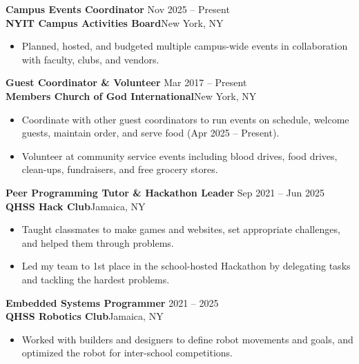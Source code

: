 \documentclass[10pt,letterpaper]{article}
\newcommand{\entry}[4]{%
  \textbf{#1} \hfill {\color{muted}#3}\\
  {\color{accent}\textbf{#2}}\hfill {\color{muted}\small #4}\par}
\begin{document}
\vspace{3pt}
\entry{Campus Events Coordinator}{NYIT Campus Activities Board}{Nov 2025 -- Present}{New York, NY}
\begin{itemize}
  \item Planned, hosted, and budgeted multiple campus-wide events in collaboration with faculty, clubs, and vendors.
\end{itemize}
\vspace{3pt}
\entry{Guest Coordinator \& Volunteer}{Members Church of God International}{Mar 2017 -- Present}{New York, NY}
\begin{itemize}
  \item Coordinate with other guest coordinators to run events on schedule, welcome guests, maintain order, and serve food (Apr 2025 -- Present).
  \item Volunteer at community service events including blood drives, food drives, clean-ups, fundraisers, and free grocery stores.
\end{itemize}
\vspace{3pt}
\entry{Peer Programming Tutor \& Hackathon Leader}{QHSS Hack Club}{Sep 2021 -- Jun 2025}{Jamaica, NY}
\begin{itemize}
  \item Taught classmates to make games and websites, set appropriate challenges, and helped them through problems.
  \item Led my team to 1st place in the school-hosted Hackathon by delegating tasks and tackling the hardest problems.
\end{itemize}
\vspace{3pt}
\entry{Embedded Systems Programmer}{QHSS Robotics Club}{2021 -- 2025}{Jamaica, NY}
\begin{itemize}
  \item Worked with builders and designers to define robot movements and goals, and optimized the robot for inter-school competitions.
\end{itemize}

\end{document}
